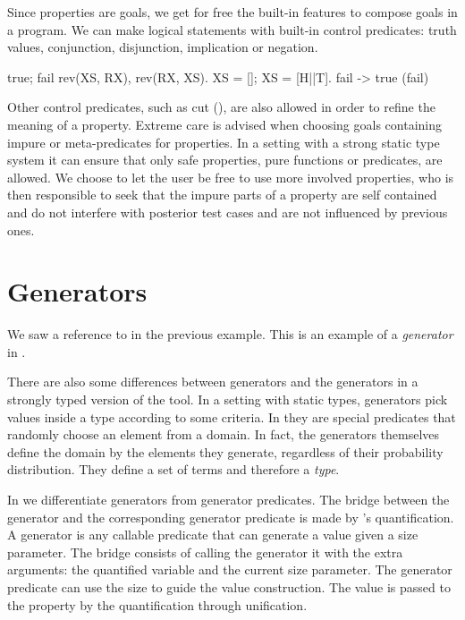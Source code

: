Since properties are \Prolog{} goals,  we get for free the built-in
features to compose goals in a program.
%
We can make logical statements with built-in control predicates:
truth values, conjunction, disjunction, implication or negation.
%
\begin{yapcode}
   true; fail
   rev(XS, RX), rev(RX, XS).
   XS = []; XS = [H||T].
   fail -> true
   \+(fail)
\end{yapcode}
%
Other control predicates, such as cut (\yap{!}), are also allowed in
order to refine the meaning of a property.
%
Extreme care is advised when choosing goals containing impure or
meta-predicates for properties.
%
In a setting with a strong static type system it can ensure that only
safe properties, pure functions or predicates, are allowed.
%
We choose to let the user be free to use more involved properties, who
is then responsible to seek that the impure parts of a property are self
contained and do not interfere with posterior test cases and are not
influenced by previous ones.


\section{Generators}
\label{sec:generators}

We saw a reference to  in the previous example.
%
This is an example of a \emph{generator} in \plqc{}.



There are also some differences between \plqc{} generators and the
generators in a strongly typed version of the tool.
%
In a setting with static types, generators pick values inside a type
according to some criteria.
%
In \plqc{} they are special predicates that randomly choose an element
from a domain.
%
In fact, the generators themselves define the domain by the elements
they generate, regardless of their probability distribution.
%
They define a set of terms and therefore a \emph{type}.


In \plqc{} we differentiate generators from generator predicates.
%
The bridge between the generator and the corresponding generator
predicate is made by \plqc{}'s quantification.
%
A generator is any callable predicate that can generate a value given a
size parameter.
%
The bridge consists of calling the generator it with the extra
arguments: the quantified variable and the current size parameter.
%
The generator predicate can use the size to guide the value
construction.
%
The value is passed to the property by the \plqc{} quantification
through unification.



